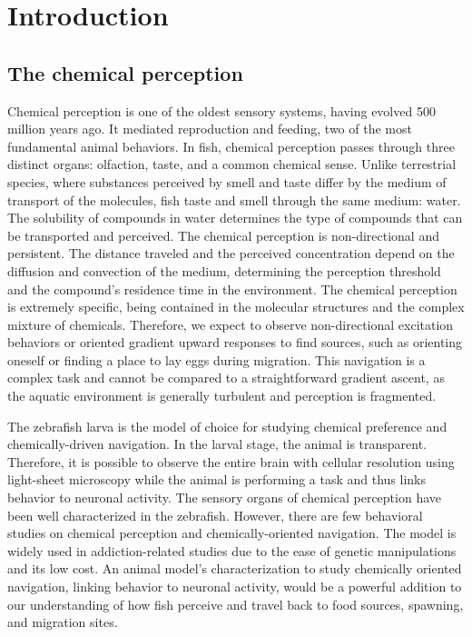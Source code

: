 \chapter{Introduction}

  \section{The chemical perception}
  Chemical perception is one of the oldest sensory systems, having evolved 500 million years ago. It mediated reproduction and feeding, two of the most fundamental animal behaviors. In fish, chemical perception passes through three distinct organs: olfaction, taste, and a common chemical sense. Unlike terrestrial species, where substances perceived by smell and taste differ by the medium of transport of the molecules, fish taste and smell through the same medium: water. The solubility of compounds in water determines the type of compounds that can be transported and perceived. The chemical perception is non-directional and persistent. The distance traveled and the perceived concentration depend on the diffusion and convection of the medium, determining the perception threshold and the compound's residence time in the environment. The chemical perception is extremely specific, being contained in the molecular structures and the complex mixture of chemicals. Therefore, we expect to observe non-directional excitation behaviors or oriented gradient upward responses to find sources, such as orienting oneself or finding a place to lay eggs during migration. This navigation is a complex task and cannot be compared to a straightforward gradient ascent, as the aquatic environment is generally turbulent and perception is fragmented.

  The zebrafish larva is the model of choice for studying chemical preference and chemically-driven navigation. In the larval stage, the animal is transparent. Therefore, it is possible to observe the entire brain with cellular resolution using light-sheet microscopy while the animal is performing a task and thus links behavior to neuronal activity. The sensory organs of chemical perception have been well characterized in the zebrafish. However, there are few behavioral studies on chemical perception and chemically-oriented navigation. The model is widely used in addiction-related studies due to the ease of genetic manipulations and its low cost. An animal model's characterization to study chemically oriented navigation, linking behavior to neuronal activity, would be a powerful addition to our understanding of how fish perceive and travel back to food sources, spawning, and migration sites.

